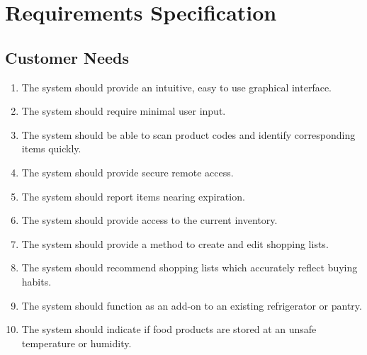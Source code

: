 \documentclass[11pt]{article} %
\begin{document}
\section{Requirements Specification}
\subsection{Customer Needs}
\begin{enumerate}
\item The system should provide an intuitive, easy to use graphical interface.
\item The system should require minimal user input.
\item The system should be able to scan product codes and identify corresponding items quickly.
\item The system should provide secure remote access.
\item The system should report items nearing expiration.
\item The system should provide access to the current inventory.
\item The system should provide a method to create and edit shopping lists.
\item The system should recommend shopping lists which accurately reflect buying habits.
\item The system should function as an add-on to an existing refrigerator or pantry.
\item The system should indicate if food products are stored at an unsafe temperature or humidity.
\end{enumerate}
\pagebreak
\end{document}

